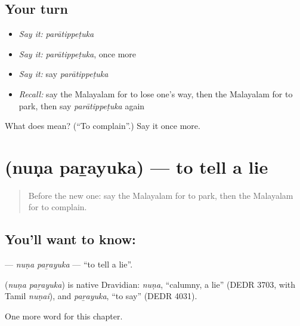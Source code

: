 \subsection*{Your turn}
\begin{itemize}
\raggedright
  \item \emph{Say it:} \emph{parātippeṭuka}
  \item \emph{Say it:} \emph{parātippeṭuka}, once more
  \item \emph{Say it:} say \emph{parātippeṭuka}
  \item \emph{Recall:} say the Malayalam for to lose one's way, then the Malayalam for to park, then say \emph{parātippeṭuka} again
\end{itemize}

\begin{tcolorbox}[breakable,colback=teal!4,colframe=teal!35!black,title={Before you move on}]
What does  mean? (\textquotedblleft{}To complain\textquotedblright{}.) Say it once more.
\end{tcolorbox}
\section[\texorpdfstring{\ml{നുണ} \ml{പറയുക} (nuṇa paṟayuka)}{നുണ പറയുക (nuṇa paṟayuka)}]{  (nuṇa paṟayuka) — to tell a lie}

\label{lesson:ML-C228-nuna-parayuka}



\begin{quote}
Before the new one: say the Malayalam for to park, then the Malayalam for to complain.
\end{quote}

\subsection*{You'll want to know:  }
\textbf{ } — \emph{nuṇa paṟayuka} — \textquotedblleft{}to tell a lie\textquotedblright{}.

\begin{cousinweb}
\textbf{ } (\emph{nuṇa paṟayuka}) is native Dravidian: \emph{nuṇa}, \textquotedblleft{}calumny, a lie\textquotedblright{} (DEDR 3703, with Tamil \emph{nuṇai}), and \emph{paṟayuka}, \textquotedblleft{}to say\textquotedblright{} (DEDR 4031).
\end{cousinweb}

\begin{grammarlens}[title={What you've built}]
One more word for this chapter.
\end{grammarlens}


